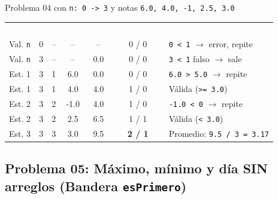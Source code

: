 \documentclass[11pt,letterpaper]{article}
\begin{document}





\begin{pruebaescritorio}{Problema 04 con \texttt{n: 0 -> 3} y notas \texttt{6.0, 4.0, -1, 2.5, 3.0}}
\begin{center}
\footnotesize
\setlength{\tabcolsep}{4pt}
\renewcommand{\arraystretch}{1.15}
\begin{tabularx}{\linewidth}{l c c c c c X}
\rowcolor{AzulMarino}
\textcolor{white}{\textbf{Paso}} & \textcolor{white}{\texttt{n}} & \textcolor{white}{\texttt{i}} & \textcolor{white}{\texttt{nota}} & \textcolor{white}{\texttt{suma}} & \textcolor{white}{\textbf{Apr / Rep}} & \textcolor{white}{\textbf{Validación}} \\
Val. \texttt{n} & 0 & -- & -- & -- & 0 / 0 & \texttt{0 < 1} $\rightarrow$ error, repite \\
Val. \texttt{n} & 3 & -- & -- & 0.0 & 0 / 0 & \texttt{3 < 1} falso $\rightarrow$ sale \\
Est. 1 & 3 & 1 & 6.0 & 0.0 & 0 / 0 & \texttt{6.0 > 5.0} $\rightarrow$ repite \\
Est. 1 & 3 & 1 & 4.0 & 4.0 & 1 / 0 & Válida (\texttt{>= 3.0}) \\
Est. 2 & 3 & 2 & -1.0 & 4.0 & 1 / 0 & \texttt{-1.0 < 0} $\rightarrow$ repite \\
Est. 2 & 3 & 2 & 2.5 & 6.5 & 1 / 1 & Válida (\texttt{< 3.0}) \\
Est. 3 & 3 & 3 & 3.0 & 9.5 & \textbf{2 / 1} & Promedio: \texttt{9.5 / 3 = 3.17} \\
\bottomrule
\end{tabularx}
\end{center}
\end{pruebaescritorio}

\subsection{Problema 05: Máximo, mínimo y día SIN arreglos (Bandera \texttt{esPrimero})}
\end{document}
